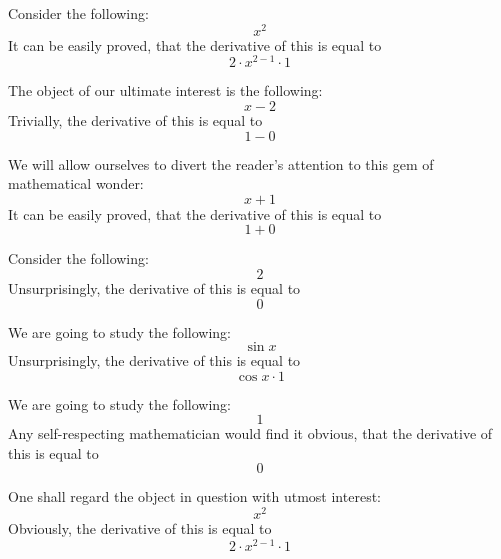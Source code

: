 \documentclass{article}
\begin{document}
Consider the following:
\begin{equation}
x ^{2 } 
\end{equation}
It can be easily proved, that the derivative of this is equal to
\begin{equation}
2 \cdot x ^{2 - 1 } \cdot 1 
\end{equation}

The object of our ultimate interest is the following:
\begin{equation}
x - 2 
\end{equation}
Trivially, the derivative of this is equal to
\begin{equation}
1 - 0 
\end{equation}

We will allow ourselves to divert the reader's attention to this gem of mathematical wonder:
\begin{equation}
x + 1 
\end{equation}
It can be easily proved, that the derivative of this is equal to
\begin{equation}
1 + 0 
\end{equation}

Consider the following:
\begin{equation}
2 
\end{equation}
Unsurprisingly, the derivative of this is equal to
\begin{equation}
0 
\end{equation}

We are going to study the following:
\begin{equation}
\sin x 
\end{equation}
Unsurprisingly, the derivative of this is equal to
\begin{equation}
\cos x \cdot 1 
\end{equation}

We are going to study the following:
\begin{equation}
1 
\end{equation}
Any self-respecting mathematician would find it obvious, that the derivative of this is equal to
\begin{equation}
0 
\end{equation}

One shall regard the object in question with utmost interest:
\begin{equation}
x ^{2 } 
\end{equation}
Obviously, the derivative of this is equal to
\begin{equation}
2 \cdot x ^{2 - 1 } \cdot 1 
\end{equation}
\end{document}
